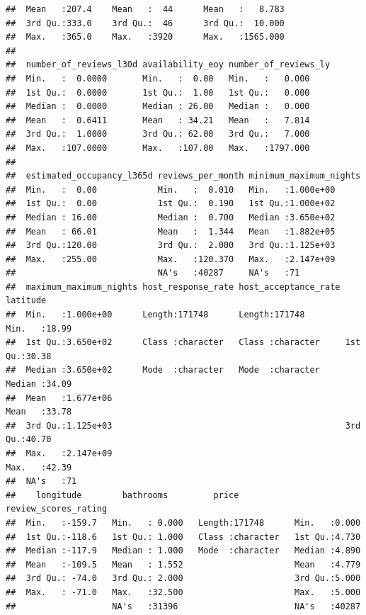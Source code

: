 \documentclass[
]{article}
\begin{document}
\begin{verbatim}
##  Mean   :207.4    Mean   :  44      Mean   :   8.783     
##  3rd Qu.:333.0    3rd Qu.:  46      3rd Qu.:  10.000     
##  Max.   :365.0    Max.   :3920      Max.   :1565.000     
##                                                          
##  number_of_reviews_l30d availability_eoy number_of_reviews_ly
##  Min.   :  0.0000       Min.   :  0.00   Min.   :   0.000    
##  1st Qu.:  0.0000       1st Qu.:  1.00   1st Qu.:   0.000    
##  Median :  0.0000       Median : 26.00   Median :   0.000    
##  Mean   :  0.6411       Mean   : 34.21   Mean   :   7.814    
##  3rd Qu.:  1.0000       3rd Qu.: 62.00   3rd Qu.:   7.000    
##  Max.   :107.0000       Max.   :107.00   Max.   :1797.000    
##                                                              
##  estimated_occupancy_l365d reviews_per_month minimum_maximum_nights
##  Min.   :  0.00            Min.   :  0.010   Min.   :1.000e+00     
##  1st Qu.:  0.00            1st Qu.:  0.190   1st Qu.:1.000e+02     
##  Median : 16.00            Median :  0.700   Median :3.650e+02     
##  Mean   : 66.01            Mean   :  1.344   Mean   :1.882e+05     
##  3rd Qu.:120.00            3rd Qu.:  2.000   3rd Qu.:1.125e+03     
##  Max.   :255.00            Max.   :120.370   Max.   :2.147e+09     
##                            NA's   :40287     NA's   :71            
##  maximum_maximum_nights host_response_rate host_acceptance_rate    latitude    
##  Min.   :1.000e+00      Length:171748      Length:171748        Min.   :18.99  
##  1st Qu.:3.650e+02      Class :character   Class :character     1st Qu.:30.38  
##  Median :3.650e+02      Mode  :character   Mode  :character     Median :34.09  
##  Mean   :1.677e+06                                              Mean   :33.78  
##  3rd Qu.:1.125e+03                                              3rd Qu.:40.70  
##  Max.   :2.147e+09                                              Max.   :42.39  
##  NA's   :71                                                                    
##    longitude        bathrooms         price           review_scores_rating
##  Min.   :-159.7   Min.   : 0.000   Length:171748      Min.   :0.000       
##  1st Qu.:-118.6   1st Qu.: 1.000   Class :character   1st Qu.:4.730       
##  Median :-117.9   Median : 1.000   Mode  :character   Median :4.890       
##  Mean   :-109.5   Mean   : 1.552                      Mean   :4.779       
##  3rd Qu.: -74.0   3rd Qu.: 2.000                      3rd Qu.:5.000       
##  Max.   : -71.0   Max.   :32.500                      Max.   :5.000       
##                   NA's   :31396                       NA's   :40287       

\end{verbatim}
\end{document}
